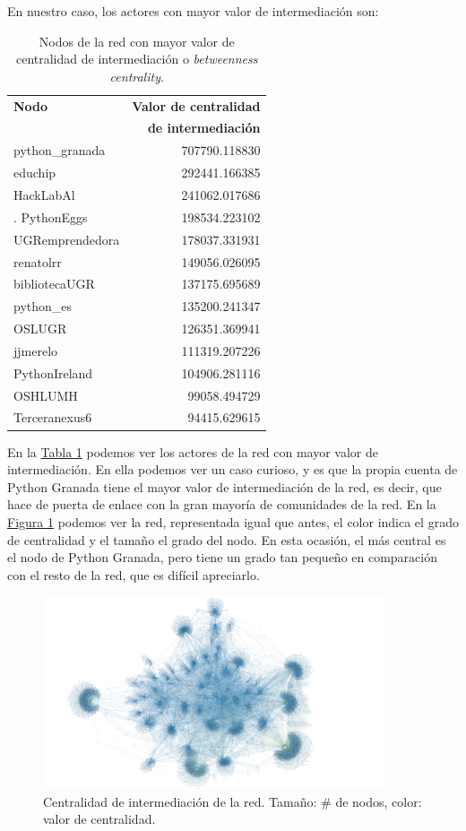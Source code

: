 \documentclass[paper=a4, fontsize=11pt]{article} %
\numberwithin{equation}{section} %
\numberwithin{figure}{section} %
\numberwithin{table}{section} %
\begin{document}
En nuestro caso, los actores con mayor valor de intermediación son:

\begin{table}[H]
\begin{tabular}{l|r}
\textbf{Nodo} & \textbf{Valor de centralidad} \\
& \textbf{de intermediación}\\
\hline
python\_granada & 707790.118830 \\
educhip & 292441.166385 \\
HackLabAl & 241062.017686 \\.
PythonEggs & 198534.223102 \\
UGRemprendedora & 178037.331931 \\
renatolrr & 149056.026095 \\
bibliotecaUGR & 137175.695689 \\
python\_es & 135200.241347 \\
OSLUGR & 126351.369941 \\
jjmerelo & 111319.207226 \\
PythonIreland & 104906.281116 \\
OSHLUMH & 99058.494729 \\
Terceranexus6 & 94415.629615 \\
\end{tabular}
\label{between}
\caption{Nodos de la red con mayor valor de centralidad de intermediación o \textit{betweenness centrality}.}
\end{table}

En la \hyperref[between]{Tabla \ref*{between}} podemos ver los actores de la red con mayor valor de intermediación. En ella podemos ver un caso curioso, y es que la propia cuenta de Python Granada tiene el mayor valor de intermediación de la red, es decir, que hace de puerta de enlace con la gran mayoría de comunidades de la red. En la \hyperref[im5]{Figura \ref*{im5}} podemos ver la red, representada igual que antes, el color indica el grado de centralidad y el tamaño el grado del nodo. En esta ocasión, el más central es el nodo de Python Granada, pero tiene un grado tan pequeño en comparación con el resto de la red, que es difícil apreciarlo.
\begin{figure}[H]
  \centering
  \includegraphics[width=0.9\textwidth]{../Visualizaciones/between}
  \caption{Centralidad de intermediación de la red. Tamaño: \# de nodos, color: valor de centralidad.}
  \label{im5}
\end{figure}
\end{document}
